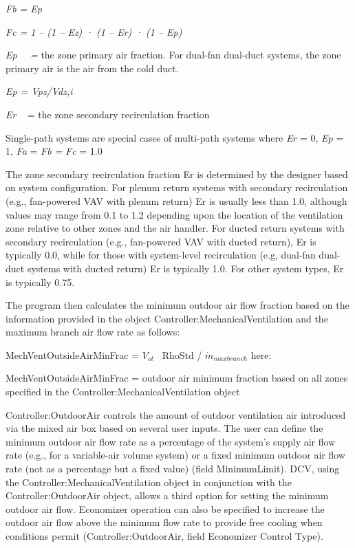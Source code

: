 \emph{Fb = Ep}

\emph{Fc = 1 --} \emph{(1 -- Ez) · (1 -- Er) · (1 -- Ep)}

\emph{Ep~~ =} the zone primary air fraction. For dual-fan dual-duct systems, the zone primary air is the air from the cold duct.

\emph{Ep = Vpz/Vdz,i}

\emph{Er} ~ = the zone secondary recirculation fraction

Single-path systems are special cases of multi-path systems where \emph{Er} = 0, \emph{Ep} = 1, \emph{Fa} = \emph{Fb =} \emph{Fc} = 1.0

The zone secondary recirculation fraction Er is determined by the designer based on system configuration. For plenum return systems with secondary recirculation (e.g., fan-powered VAV with plenum return) Er is usually less than 1.0, although values may range from 0.1 to 1.2 depending upon the location of the ventilation zone relative to other zones and the air handler. For ducted return systems with secondary recirculation (e.g., fan-powered VAV with ducted return), Er is typically 0.0, while for those with system-level recirculation (e.g, dual-fan dual-duct systems with ducted return) Er is typically 1.0. For other system types, Er is typically 0.75.

The program then calculates the minimum outdoor air flow fraction based on the information provided in the object Controller:MechanicalVentilation and the maximum branch air flow rate as follows:

MechVentOutsideAirMinFrac = \({V_{ot}}\) ~RhoStd / \(\dot m{_{maxbranch}}\) here:

MechVentOutsideAirMinFrac = outdoor air minimum fraction based on all zones specified in the Controller:MechanicalVentilation object

Controller:OutdoorAir controls the amount of outdoor ventilation air introduced via the mixed air box based on several user inputs. The user can define the minimum outdoor air flow rate as a percentage of the system's supply air flow rate (e.g., for a variable-air volume system) or a fixed minimum outdoor air flow rate (not as a percentage but a fixed value) (field MinimumLimit). DCV, using the Controller:MechanicalVentilation object in conjunction with the Controller:OutdoorAir object, allows a third option for setting the minimum outdoor air flow. Economizer operation can also be specified to increase the outdoor air flow above the minimum flow rate to provide free cooling when conditions permit (Controller:OutdoorAir, field Economizer Control Type).

